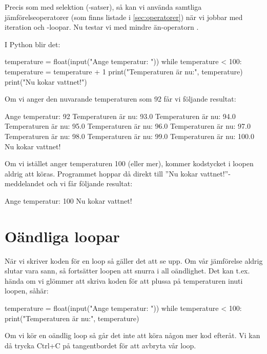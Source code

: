 Precis som med selektion (-satser), så kan vi använda samtliga jämförelseoperatorer (som finns listade i \autoref{sec:operatorer}) när vi jobbar med iteration och -loopar. Nu testar vi med mindre än-operatorn \cw{<}.

I Python blir det:

\begin{python}[caption={Vår första while-loop},label={}]
temperature = float(input("Ange temperatur: "))
while temperature < 100:
	temperature = temperature + 1
	print("Temperaturen är nu:", temperature)
print("Nu kokar vattnet!")
\end{python}

Om vi anger den nuvarande temperaturen som 92 får vi följande resultat:

\vspace{10pt}
\begin{python}
Ange temperatur: 92
Temperaturen är nu: 93.0
Temperaturen är nu: 94.0
Temperaturen är nu: 95.0
Temperaturen är nu: 96.0
Temperaturen är nu: 97.0
Temperaturen är nu: 98.0
Temperaturen är nu: 99.0
Temperaturen är nu: 100.0
Nu kokar vattnet!
\end{python}

Om vi istället anger temperaturen 100 (eller mer), kommer kodstycket i loopen aldrig att köras. Programmet hoppar då direkt till ''Nu kokar vattnet!''-meddelandet och vi får följande resultat:

\vspace{10pt}
\begin{python}
Ange temperatur: 100
Nu kokar vattnet!
\end{python}

\section{Oändliga loopar}
När vi skriver koden för en loop så gäller det att se upp. Om vår jämförelse aldrig slutar vara sann, så fortsätter loopen att snurra i all oändlighet. Det kan t.ex. hända om vi glömmer att skriva koden för att plussa på temperaturen inuti loopen, såhär:

\begin{python}[caption={Oändlig loop, varning!},label={}]
temperature = float(input("Ange temperatur: "))
while temperature < 100:
	print("Temperaturen är nu:", temperature)
\end{python}

Om vi kör en oändlig loop så går det inte att köra någon mer kod efteråt. Vi kan då trycka Ctrl+C på tangentbordet för att avbryta vår loop.

